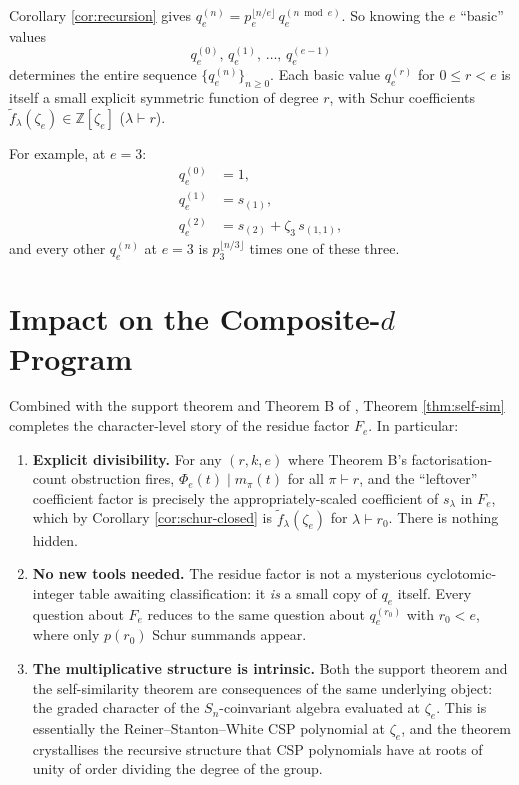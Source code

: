 \documentclass[11pt]{article}
\theoremstyle{remark}
\newcommand{\ftilde}{\widetilde{f}}
\newcommand{\qe}{q_e}
\newcommand{\zetae}{\zeta_e}
\newcommand{\ZZ}{\mathbb{Z}}
\begin{document}
Corollary \ref{cor:recursion} gives $\qe^{(n)} = p_e^{\lfloor n/e\rfloor}\, \qe^{(n \bmod e)}$. So knowing the $e$ ``basic'' values
\[
  \qe^{(0)},\, \qe^{(1)},\, \ldots,\, \qe^{(e-1)}
\]
determines the entire sequence $\{\qe^{(n)}\}_{n \ge 0}$. Each basic value $\qe^{(r)}$ for $0 \le r < e$ is itself a small explicit symmetric function of degree $r$, with Schur coefficients $\ftilde_\lambda(\zetae) \in \ZZ[\zetae]$ ($\lambda \vdash r$).

For example, at $e = 3$:
\begin{align*}
  \qe^{(0)} &= 1, \\
  \qe^{(1)} &= s_{(1)}, \\
  \qe^{(2)} &= s_{(2)} + \zeta_3\, s_{(1,1)},
\end{align*}
and every other $\qe^{(n)}$ at $e = 3$ is $p_3^{\lfloor n/3\rfloor}$ times one of these three.

\section{Impact on the Composite-$d$ Program}

Combined with the support theorem \cite{Cli26-support} and Theorem B of \cite{Cli26-composite-d}, Theorem \ref{thm:self-sim} completes the character-level story of the residue factor $F_e$. In particular:

\begin{enumerate}
  \item \textbf{Explicit divisibility.} For any $(r, k, e)$ where Theorem B's factorisation-count obstruction fires, $\Phi_e(t) \mid m_\pi(t)$ for all $\pi \vdash r$, and the ``leftover'' coefficient factor is precisely the appropriately-scaled coefficient of $s_\lambda$ in $F_e$, which by Corollary \ref{cor:schur-closed} is $\ftilde_\lambda(\zetae)$ for $\lambda \vdash r_0$. There is nothing hidden.

  \item \textbf{No new tools needed.} The residue factor is not a mysterious cyclotomic-integer table awaiting classification: it \emph{is} a small copy of $q_e$ itself. Every question about $F_e$ reduces to the same question about $q_e^{(r_0)}$ with $r_0 < e$, where only $p(r_0)$ Schur summands appear.

  \item \textbf{The multiplicative structure is intrinsic.} Both the support theorem and the self-similarity theorem are consequences of the same underlying object: the graded character of the $S_n$-coinvariant algebra evaluated at $\zetae$. This is essentially the Reiner--Stanton--White CSP polynomial at $\zetae$, and the theorem crystallises the recursive structure that CSP polynomials have at roots of unity of order dividing the degree of the group.
\end{enumerate}
\end{document}
